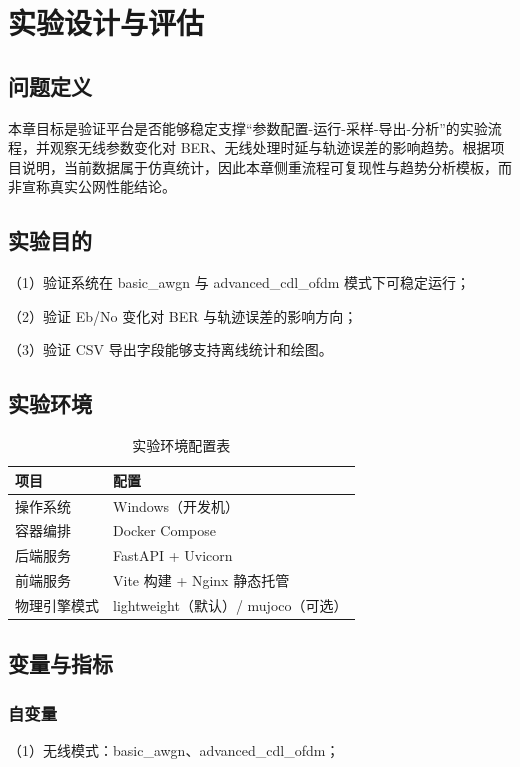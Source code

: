 
\section{实验设计与评估}

\subsection{问题定义}
本章目标是验证平台是否能够稳定支撑“参数配置-运行-采样-导出-分析”的实验流程，并观察无线参数变化对 BER、无线处理时延与轨迹误差的影响趋势。根据项目说明，当前数据属于仿真统计，因此本章侧重流程可复现性与趋势分析模板，而非宣称真实公网性能结论。

\subsection{实验目的}
（1）验证系统在 basic\_awgn 与 advanced\_cdl\_ofdm 模式下可稳定运行；

（2）验证 Eb/No 变化对 BER 与轨迹误差的影响方向；

（3）验证 CSV 导出字段能够支持离线统计和绘图。

\subsection{实验环境}
\begin{table}[htbp]
\centering
\caption{实验环境配置表}
\label{tab:exp-env}
\begin{tabular}{ll}
\hline
项目 & 配置 \\
\hline
操作系统 & Windows（开发机） \\
容器编排 & Docker Compose \\
后端服务 & FastAPI + Uvicorn \\
前端服务 & Vite 构建 + Nginx 静态托管 \\
物理引擎模式 & lightweight（默认）/ mujoco（可选） \\
\hline
\end{tabular}
\end{table}

\subsection{变量与指标}
\subsubsection{自变量}
（1）无线模式：basic\_awgn、advanced\_cdl\_ofdm；

